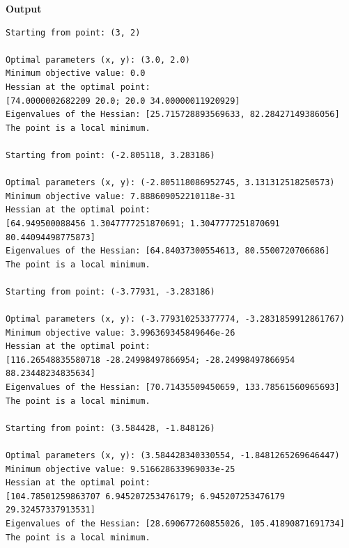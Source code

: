 \textbf{Output} 
\begin{verbatim}
Starting from point: (3, 2)

Optimal parameters (x, y): (3.0, 2.0)
Minimum objective value: 0.0
Hessian at the optimal point: 
[74.0000002682209 20.0; 20.0 34.00000011920929]
Eigenvalues of the Hessian: [25.715728893569633, 82.28427149386056]
The point is a local minimum.

Starting from point: (-2.805118, 3.283186)

Optimal parameters (x, y): (-2.805118086952745, 3.131312518250573)
Minimum objective value: 7.888609052210118e-31
Hessian at the optimal point: 
[64.949500088456 1.3047777251870691; 1.3047777251870691 80.44094498775873]
Eigenvalues of the Hessian: [64.84037300554613, 80.5500720706686]
The point is a local minimum.

Starting from point: (-3.77931, -3.283186)

Optimal parameters (x, y): (-3.779310253377774, -3.2831859912861767)
Minimum objective value: 3.996369345849646e-26
Hessian at the optimal point: 
[116.26548835580718 -28.24998497866954; -28.24998497866954 88.23448234835634]
Eigenvalues of the Hessian: [70.71435509450659, 133.78561560965693]
The point is a local minimum.

Starting from point: (3.584428, -1.848126)

Optimal parameters (x, y): (3.584428340330554, -1.8481265269646447)
Minimum objective value: 9.516628633969033e-25
Hessian at the optimal point: 
[104.78501259863707 6.945207253476179; 6.945207253476179 29.32457337913531]
Eigenvalues of the Hessian: [28.690677260855026, 105.41890871691734]
The point is a local minimum.
\end{verbatim}


\vspace*{1cm}

